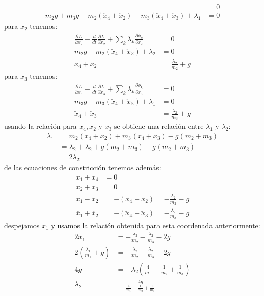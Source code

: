 \documentclass{article}
\begin{document}
\begin{tcolorbox}[breakable]
\begin{align*}
        &= 0  \\
        m_2g+m_3g - m_2(\ddot{x}_4+\ddot{x}_2) - m_3(\ddot{x}_4+\ddot{x}_3) + \lambda_1 &= 0
    \end{align*}
    para $x_2$ tenemos:
    \begin{align*}
        \frac{\partial L}{\partial x_2} 
        -\frac{d}{dt}\frac{\partial L}{\partial \dot{x}_2} 
        + \sum_k \lambda_k \frac{\partial \phi_k}{\partial x_2}
        &= 0  \\
        m_2g-m_2(\ddot{x}_4+\ddot{x}_2) + \lambda_2 &= 0 \\
        \ddot{x}_4+\ddot{x}_2 &= \frac{\lambda_2}{m_2} + g
    \end{align*}
    para $x_3$ tenemos:
    \begin{align*}
        \frac{\partial L}{\partial x_3} 
        -\frac{d}{dt}\frac{\partial L}{\partial \dot{x}_3} 
        + \sum_k \lambda_k \frac{\partial \phi_k}{\partial x_3}
        &= 0  \\
        m_3g - m_3(\ddot{x}_4+\ddot{x}_3) + \lambda_1 &= 0 \\
        \ddot{x}_4+ \ddot{x}_3 &= \frac{\lambda_2}{m_3}+g
    \end{align*}
    usando la relación para $x_4,x_2$ y $x_3$ se obtiene una relación entre $\lambda_1$ y $\lambda_2$:
    \begin{align*}
        \lambda_1 
        &= m_2(\ddot{x}_4+\ddot{x}_2) + m_3(\ddot{x}_4+\ddot{x}_3) - g(m_2+m_3) \\
        &= \lambda_2 + \lambda_2 + g(m_2+m_3) - g(m_2+m_3) \\
        &= 2\lambda_2 
    \end{align*}
    de las ecuaciones de constricción tenemos además:
    \begin{align*}
        \ddot{x_1}+\ddot{x_4} &= 0 \\
        \ddot{x_2}+\ddot{x_3} &= 0 \\ 
        \ddot{x_1}-\ddot{x_2} &= -(\ddot{x_4}+\ddot{x}_2) = -\tfrac{\lambda_2}{m_2}-g \\
        \ddot{x_1}+\ddot{x_2} &= -(\ddot{x}_4+\ddot{x}_3) = -\tfrac{\lambda_2}{m_3}-g 
    \end{align*}
    despejamos $x_1$ y usamos la relación obtenida para esta coordenada anteriormente:
    \begin{align*}
        2\ddot{x}_1 &= -\tfrac{\lambda_2}{m_2}-\tfrac{\lambda_2}{m_3}-2g \\
        2(\tfrac{\lambda_1}{m_1}+g) &= -\tfrac{\lambda_2}{m_2}-\tfrac{\lambda_2}{m_3}-2g \\
        4g &= -\lambda_2(\tfrac{4}{m_1}+\tfrac{1}{m_2}+\tfrac{1}{m_3}) \\
        \lambda_2 &= \frac{4g}{\tfrac{4}{m_1}+\tfrac{1}{m_2}+\tfrac{1}{m_3}} 
    \end{align*} 

\end{tcolorbox}
\end{document}
